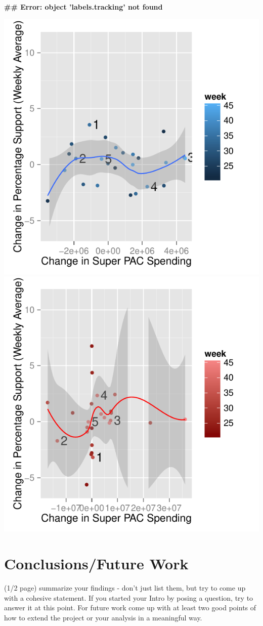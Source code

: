 \documentclass[11pt]{article}\usepackage{graphicx, color}
\makeatletter
\newenvironment{kframe}{%
 \def\at@end@of@kframe{}%
 \ifinner\ifhmode%
  \def\at@end@of@kframe{\end{minipage}}%
  \begin{minipage}{\columnwidth}%
 \fi\fi%
 \def\FrameCommand##1{\hskip\@totalleftmargin \hskip-\fboxsep
 \colorbox{shadecolor}{##1}\hskip-\fboxsep
     \hskip-\linewidth \hskip-\@totalleftmargin \hskip\columnwidth}%
 \MakeFramed {\advance\hsize-\width
   \@totalleftmargin\z@ \linewidth\hsize
   \@setminipage}}%
 {\par\unskip\endMakeFramed%
 \at@end@of@kframe}
\newenvironment{knitrout}{}{} %
\makeatother
\begin{document}
\begin{knitrout}
\color{fgcolor}\begin{kframe}


{\ttfamily\noindent\bfseries\textcolor{errorcolor}{\#\# Error: object 'labels.tracking' not found}}\end{kframe}
\end{knitrout}

\begin{knitrout}
\color{fgcolor}\includegraphics[width=.45\textwidth]{figure/support_spend1} \includegraphics[width=.45\textwidth]{figure/support_spend2} 
\end{knitrout}


\section{Conclusions/Future Work}
(1/2 page) 
summarize your findings - don't just list them, but try to come up with a cohesive statement. If you started your Intro by posing a question, try to answer it at this point.
For future work come up with at least two good points of how to extend the project or your analysis in a meaningful way.
\end{document}
